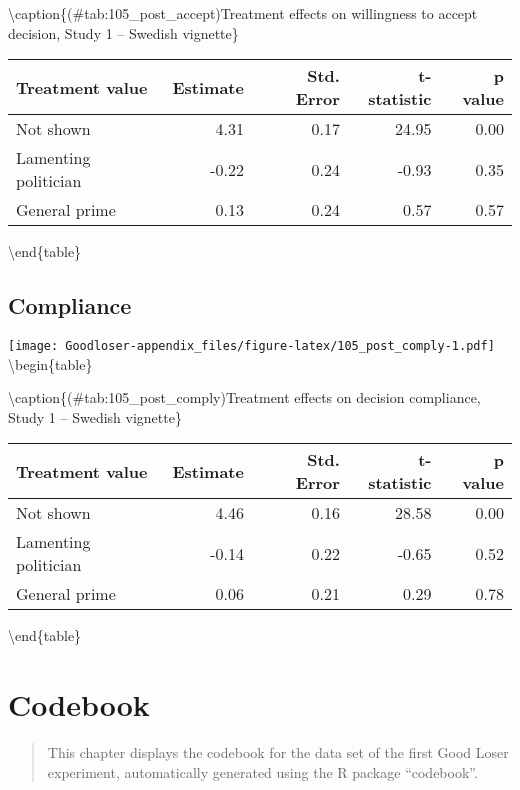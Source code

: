 \documentclass[
]{book}
\begin{document}
\textbackslash caption\{(\#tab:105\_post\_accept)Treatment effects on willingness to accept decision, Study 1 -- Swedish vignette\}
\centering

\begin{tabular}[t]{lrrrr}
\toprule
Treatment value & Estimate & Std. Error & t-statistic & p value\\
\midrule
Not shown & 4.31 & 0.17 & 24.95 & 0.00\\
Lamenting politician & -0.22 & 0.24 & -0.93 & 0.35\\
General prime & 0.13 & 0.24 & 0.57 & 0.57\\
\bottomrule
\end{tabular}

\textbackslash end\{table\}

\hypertarget{compliance-1}{%
\section{Compliance}\label{compliance-1}}

\texttt{[image: Goodloser-appendix\_files/figure-latex/105\_post\_comply-1.pdf]} \textbackslash begin\{table\}

\textbackslash caption\{(\#tab:105\_post\_comply)Treatment effects on decision compliance, Study 1 -- Swedish vignette\}
\centering

\begin{tabular}[t]{lrrrr}
\toprule
Treatment value & Estimate & Std. Error & t-statistic & p value\\
\midrule
Not shown & 4.46 & 0.16 & 28.58 & 0.00\\
Lamenting politician & -0.14 & 0.22 & -0.65 & 0.52\\
General prime & 0.06 & 0.21 & 0.29 & 0.78\\
\bottomrule
\end{tabular}

\textbackslash end\{table\}

\hypertarget{codebook}{%
\chapter{Codebook}\label{codebook}}

\begin{quote}
This chapter displays the codebook for the data set of the first Good Loser experiment, automatically generated using the R package ``codebook''.
\end{quote}
\end{document}
